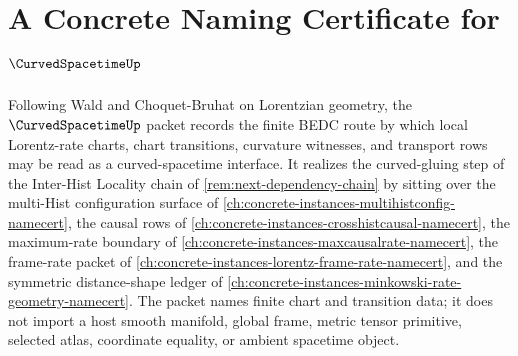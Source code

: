 \chapter{A Concrete Naming Certificate for $\CurvedSpacetimeUp$}
\label{ch:concrete-instances-curved-spacetime-namecert}

Following Wald and Choquet-Bruhat on Lorentzian geometry, the $\CurvedSpacetimeUp$ packet records the finite BEDC route by which local Lorentz-rate charts, chart transitions, curvature witnesses, and transport rows may be read as a curved-spacetime interface. It realizes the curved-gluing step of the Inter-Hist Locality chain of \autoref{rem:next-dependency-chain} by sitting over the multi-Hist configuration surface of \autoref{ch:concrete-instances-multihistconfig-namecert}, the causal rows of \autoref{ch:concrete-instances-crosshistcausal-namecert}, the maximum-rate boundary of \autoref{ch:concrete-instances-maxcausalrate-namecert}, the frame-rate packet of \autoref{ch:concrete-instances-lorentz-frame-rate-namecert}, and the symmetric distance-shape ledger of \autoref{ch:concrete-instances-minkowski-rate-geometry-namecert}. The packet names finite chart and transition data; it does not import a host smooth manifold, global frame, metric tensor primitive, selected atlas, coordinate equality, or ambient spacetime object.

